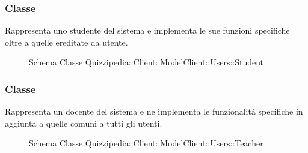 \subsubsection{Classe }
Rappresenta uno studente del sistema e implementa le sue funzioni specifiche oltre a quelle ereditate da utente.
\begin{figure}[H]
\centering
\noindent{}
\caption[Schema Classe Student]{Schema Classe Quizzipedia::Client::ModelClient::Users::Student}
\end{figure}
\subsubsection{Classe }
Rappresenta un docente del sistema e ne implementa le funzionalità specifiche in aggiunta a quelle comuni a tutti gli utenti.
\begin{figure}[H]
\centering
\noindent{}
\caption[Schema Classe Teacher]{Schema Classe Quizzipedia::Client::ModelClient::Users::Teacher}
\end{figure}
